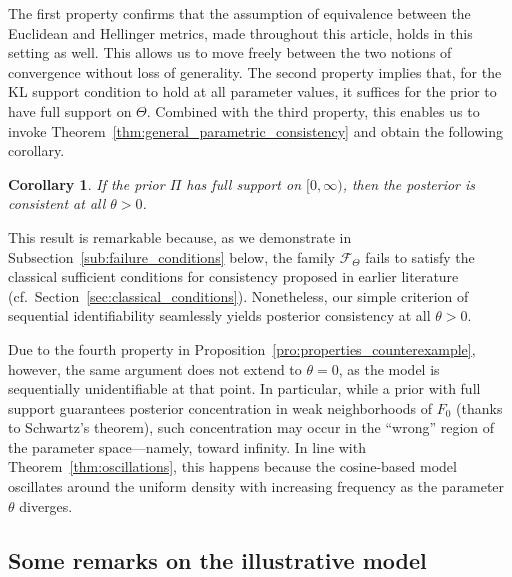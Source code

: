 \documentclass[11pt,twoside]{article}
\newtheorem{corollary}{Corollary}%
\begin{document}
The first property confirms that the assumption of equivalence between the Euclidean and Hellinger metrics, made throughout this article, holds in this setting as well. This allows us to move freely between the two notions of convergence without loss of generality. The second property implies that, for the KL support condition to hold at all parameter values, it suffices for the prior to have full support on $\Theta$. Combined with the third property, this enables us to invoke Theorem~\ref{thm:general_parametric_consistency} and obtain the following corollary.

\begin{corollary}
    If the prior $\Pi$ has full support on $[0,\infty)$, then the posterior is consistent at all $\theta > 0$.
\end{corollary}

This result is remarkable because, as we demonstrate in Subsection~\ref{sub:failure_conditions} below, the family $\mathcal F_\Theta$ fails to satisfy the classical sufficient conditions for consistency proposed in earlier literature (cf.\ Section~\ref{sec:classical_conditions}). Nonetheless, our simple criterion of sequential identifiability seamlessly yields posterior consistency at all $\theta>0$.

Due to the fourth property in Proposition~\ref{pro:properties_counterexample}, however, the same argument does not extend to \(\theta = 0\), as the model is sequentially unidentifiable at that point. In particular, while a prior with full support guarantees posterior concentration in weak neighborhoods of \(F_0\) (thanks to Schwartz's theorem), such concentration may occur in the ``wrong'' region of the parameter space—namely, toward infinity. In line with Theorem~\ref{thm:oscillations}, this happens because the cosine-based model oscillates around the uniform density with increasing frequency as the parameter \(\theta\) diverges. 


\subsection{Some remarks on the illustrative model}
\end{document}

